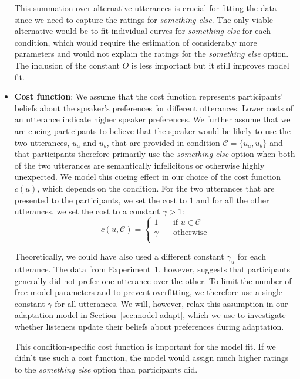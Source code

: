 \documentclass[man, floatsintext]{apa6}
\newcommand{\sectionref}[1]{Section~\ref{#1}}
\begin{document}
\begin{itemize}
This summation over alternative utterances is crucial for fitting the data since we need to
capture the ratings for \textit{something else}. The only viable alternative would be
to fit individual curves for \textit{something else} for each condition, which would require
the estimation of considerably more parameters and would not explain the ratings for the
\textit{something else} option. The inclusion of the constant $O$ is less important but it
still improves model fit.


\item \textbf{Cost function}: We assume that the cost function represents participants' beliefs about the speaker's 
preferences for different utterances. Lower costs of an utterance indicate higher speaker preferences. We further 
assume that we are cueing participants to believe that the speaker would be likely to use the two utterances, $u_a$ 
and $u_b$, that are provided in condition $\mathscr{C}=\{u_a, u_b\}$ and that participants therefore primarily use the 
\textit{something else} option when both of the two utterances are semantically infelicitous or otherwise highly unexpected. 
We model this cueing effect in our choice of the cost function $c(u)$, which depends on the condition. For the two utterances 
that are presented to the participants, we set the cost to $1$ and for all the other utterances, we set the cost to a constant $\gamma > 1$:
$$
c(u, \mathscr{C}) = 
     \begin{cases}
       1 &\quad\text{if } u  \in \mathscr{C}\\
       \gamma &\quad\text{otherwise} \\
     \end{cases}
$$

Theoretically, we could have also used a different constant $\gamma_u$ for each utterance. The data from
Experiment~1, however, suggests that participants generally did not prefer one utterance over 
the other. To limit the number of free model parameters and to prevent overfitting, we therefore use a single
constant $\gamma$ for all utterances. We will, however, relax this assumption in our adaptation model in \sectionref{sec:model-adapt}, which
we use to investigate whether listeners update their beliefs about preferences during adaptation.

This condition-specific cost function is important for the model fit. If we didn't use such a cost function, 
the model would assign much higher ratings to the \textit{something else} option than participants did.


\end{itemize}
\end{document}
